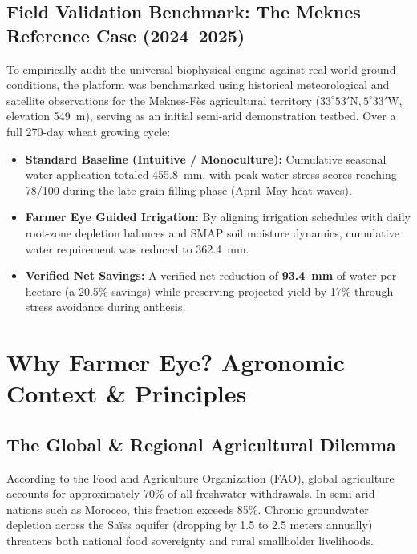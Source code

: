 \documentclass[11pt,a4paper,oneside]{report}
\begin{document}
\section{Field Validation Benchmark: The Meknes Reference Case (2024–2025)}
To empirically audit the universal biophysical engine against real-world ground conditions, the platform was benchmarked using historical meteorological and satellite observations for the Meknes-Fès agricultural territory ($33^\circ 53' \text{N}, 5^\circ 33' \text{W}$, elevation 549~m), serving as an initial semi-arid demonstration testbed. Over a full 270-day wheat growing cycle:
\begin{itemize}[leftmargin=*]
    \item \textbf{Standard Baseline (Intuitive / Monoculture):} Cumulative seasonal water application totaled 455.8~mm, with peak water stress scores reaching 78/100 during the late grain-filling phase (April–May heat waves).
    \item \textbf{Farmer Eye Guided Irrigation:} By aligning irrigation schedules with daily root-zone depletion balances and SMAP soil moisture dynamics, cumulative water requirement was reduced to 362.4~mm.
    \item \textbf{Verified Net Savings:} A verified net reduction of \textbf{93.4~mm} of water per hectare (a 20.5\% savings) while preserving projected yield by 17\% through stress avoidance during anthesis.
\end{itemize}

\chapter{Why Farmer Eye? Agronomic Context \& Principles}

\section{The Global \& Regional Agricultural Dilemma}
According to the Food and Agriculture Organization (FAO), global agriculture accounts for approximately 70\% of all freshwater withdrawals. In semi-arid nations such as Morocco, this fraction exceeds 85\%. Chronic groundwater depletion across the Saïss aquifer (dropping by 1.5 to 2.5 meters annually) threatens both national food sovereignty and rural smallholder livelihoods.
\end{document}
